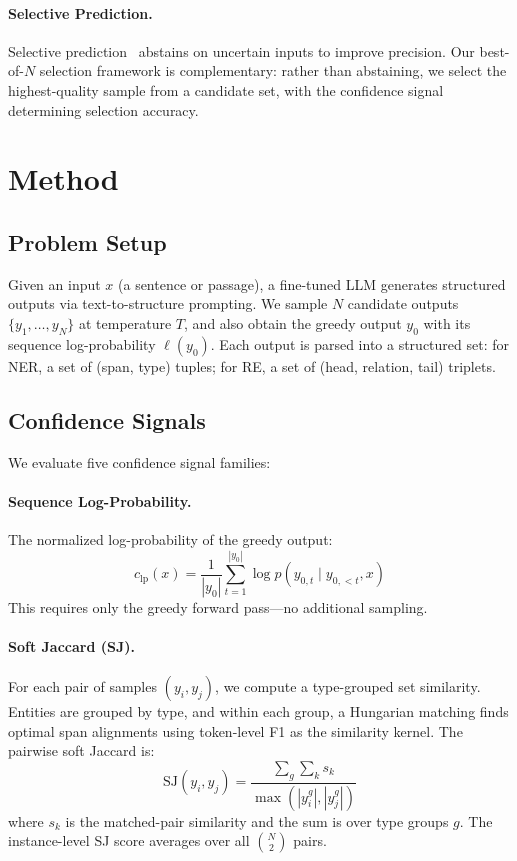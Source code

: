 \documentclass[11pt,a4paper]{article}
\begin{document}
\paragraph{Selective Prediction.}
Selective prediction~\cite{geifman2017selective} abstains on uncertain inputs to improve precision. Our best-of-$N$ selection framework is complementary: rather than abstaining, we select the highest-quality sample from a candidate set, with the confidence signal determining selection accuracy.


\section{Method}

\subsection{Problem Setup}

Given an input $x$ (a sentence or passage), a fine-tuned LLM generates structured outputs via text-to-structure prompting. We sample $N$ candidate outputs $\{y_1, \ldots, y_N\}$ at temperature $T$, and also obtain the greedy output $y_0$ with its sequence log-probability $\ell(y_0)$. Each output is parsed into a structured set: for NER, a set of (span, type) tuples; for RE, a set of (head, relation, tail) triplets.

\subsection{Confidence Signals}

We evaluate five confidence signal families:

\paragraph{Sequence Log-Probability.}
The normalized log-probability of the greedy output:
\begin{equation}
    c_{\text{lp}}(x) = \frac{1}{|y_0|} \sum_{t=1}^{|y_0|} \log p(y_{0,t} \mid y_{0,<t}, x)
\end{equation}
This requires only the greedy forward pass---no additional sampling.

\paragraph{Soft Jaccard (SJ).}
For each pair of samples $(y_i, y_j)$, we compute a type-grouped set similarity. Entities are grouped by type, and within each group, a Hungarian matching finds optimal span alignments using token-level F1 as the similarity kernel. The pairwise soft Jaccard is:
\begin{equation}
    \text{SJ}(y_i, y_j) = \frac{\sum_g \sum_k s_k}{\max(|y_i^g|, |y_j^g|)}
\end{equation}
where $s_k$ is the matched-pair similarity and the sum is over type groups $g$. The instance-level SJ score averages over all $\binom{N}{2}$ pairs.
\end{document}
